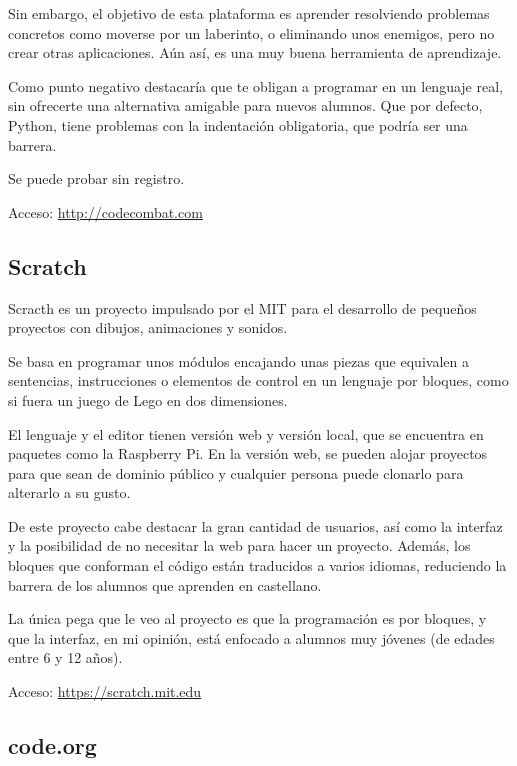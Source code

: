 \documentclass{report}
\begin{document}
	Sin embargo, el objetivo de esta plataforma es aprender resolviendo problemas concretos como moverse por un laberinto, o eliminando unos enemigos, pero no crear otras aplicaciones. Aún así, es una muy buena herramienta de aprendizaje.
	
	Como punto negativo destacaría que te obligan a programar en un lenguaje real, sin ofrecerte una alternativa amigable para nuevos alumnos. Que por defecto, Python, tiene problemas con la indentación obligatoria, que podría ser una barrera.
	
	Se puede probar sin registro. 
	
	\hfill
	
	Acceso: \url{http://codecombat.com}
	
	\subsection{Scratch}
	
	Scracth es un proyecto impulsado por el MIT para el desarrollo de pequeños proyectos con dibujos, animaciones y sonidos. 
	
	Se basa en programar unos módulos encajando unas piezas que equivalen a sentencias, instrucciones o elementos de control en un lenguaje
	por bloques, como si fuera un juego de Lego en dos dimensiones.
	
	El lenguaje y el editor tienen versión web y versión local, que se encuentra en paquetes como la Raspberry Pi. En la versión web, se pueden alojar proyectos para que 
	sean de dominio público y cualquier persona puede clonarlo para alterarlo a su gusto.
	
	De este proyecto cabe destacar la gran cantidad de usuarios, así como la interfaz y la posibilidad de no necesitar la web para hacer un proyecto. Además, los bloques que conforman el código están traducidos a varios idiomas, reduciendo la barrera de los alumnos que aprenden en castellano.
	
	La única pega que le veo al proyecto es que la programación es por bloques, y que la interfaz, en mi opinión, está enfocado a alumnos muy jóvenes (de edades entre 6 y 12 años). 
	
	\hfill
	
	Acceso: \url{https://scratch.mit.edu}
	
	\subsection{code.org}
	
\end{document}
